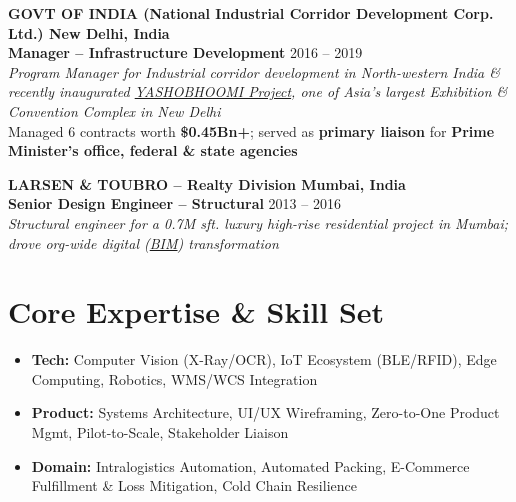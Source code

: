 \documentclass[a4paper,10.5in,13pt]{article}
\begin{document}
\textbf{GOVT OF INDIA (National Industrial Corridor Development Corp. Ltd.) \hfill New Delhi, India}\\
\textbf{Manager – Infrastructure Development} \hfill 2016 -- 2019\\
\textit{Program Manager for Industrial corridor development in North-western India \& recently inaugurated \href{https://www.youtube.com/watch?v=XrzOajNElZk}{YASHOBHOOMI Project}, one of Asia's largest Exhibition \& Convention Complex in New Delhi}\\
Managed 6 contracts worth \textbf{\$0.45Bn+}; served as \textbf{primary liaison} for \textbf{Prime Minister's office, federal \& state agencies}

\textbf{LARSEN \& TOUBRO – Realty Division \hfill Mumbai, India}\\
\textbf{Senior Design Engineer – Structural} \hfill 2013 -- 2016\\
\textit{Structural engineer for a 0.7M sft. luxury high-rise residential project in Mumbai; drove org-wide digital (\href{https://en.wikipedia.org/wiki/BIM}{BIM}) transformation}


\section{Core Expertise \& Skill Set}
\begin{itemize}[leftmargin=0pt,label={},itemsep=0pt,topsep=0pt,parsep=0pt,partopsep=0pt]
    \item \textbf{Tech:} Computer Vision (X-Ray/OCR), IoT Ecosystem (BLE/RFID), Edge Computing, Robotics, WMS/WCS Integration
    \item \textbf{Product:} Systems Architecture, UI/UX Wireframing, Zero-to-One Product Mgmt, Pilot-to-Scale, Stakeholder Liaison
    \item \textbf{Domain:} Intralogistics Automation, Automated Packing, E-Commerce Fulfillment \& Loss Mitigation, Cold Chain Resilience
\end{itemize}
\end{document}
